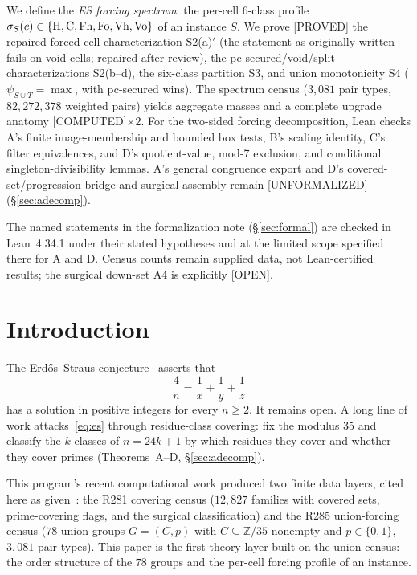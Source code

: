 \documentclass[11pt,a4paper]{article}
\theoremstyle{definition}
\newcommand{\cH}{\textnormal{H}}
\newcommand{\cC}{\textnormal{C}}
\newcommand{\cFh}{\textnormal{Fh}}
\newcommand{\cFo}{\textnormal{Fo}}
\newcommand{\cVh}{\textnormal{Vh}}
\newcommand{\cVo}{\textnormal{Vo}}
\begin{document}
We define the \emph{ES forcing spectrum}: the per-cell $6$-class profile
$\sigma_S(c)\in\{\cH,\cC,\cFh,\cFo,\cVh,\cVo\}$ of an instance $S$.  We prove
[PROVED] the repaired forced-cell characterization S2(a)$'$ (the statement as
originally written fails on void cells; repaired after review), the
pc-secured/void/split characterizations S2(b--d), the six-class partition S3,
and union monotonicity S4 ($\psi_{S\cup T}=\max$, with pc-secured wins).  The
spectrum census ($3{,}081$ pair types, $82{,}272{,}378$ weighted pairs) yields
aggregate masses and a complete upgrade anatomy [COMPUTED]$\times2$.  For
the two-sided forcing decomposition, Lean checks A's finite image-membership
and bounded box tests, B's scaling identity, C's filter equivalences, and
D's quotient-value, mod-7 exclusion, and conditional singleton-divisibility
lemmas. A's general congruence export and D's covered-set/progression bridge
and surgical assembly remain [UNFORMALIZED] (\S\ref{sec:adecomp}).

The named statements in the formalization note (\S\ref{sec:formal}) are
checked in Lean~4.34.1 under their stated hypotheses and at the limited
scope specified there for A and D. Census counts remain supplied data,
not Lean-certified results; the surgical down-set A4 is explicitly [OPEN].

\section{Introduction}

The Erd\H{o}s--Straus conjecture~\cite{Erd50} asserts that
\begin{equation}
  \label{eq:es}
  \frac{4}{n}=\frac{1}{x}+\frac{1}{y}+\frac{1}{z}
\end{equation}
has a solution in positive integers for every $n\ge2$.  It remains open.
A long line of work attacks~\eqref{eq:es} through residue-class covering:
fix the modulus $35$ and classify the $k$-classes of $n=24k+1$ by which
residues they cover and whether they cover primes
(Theorems~A--D, \S\ref{sec:adecomp}).

This program's recent computational work produced two finite data layers,
cited here as given~\cite{D322}: the R281 covering census ($12{,}827$
families with covered sets, prime-covering flags, and the surgical
classification) and the R285 union-forcing census ($78$ union groups
$G=(C,p)$ with $C\subseteq\mathbb{Z}/35$ nonempty and $p\in\{0,1\}$, $3{,}081$
pair types).  This paper is the first theory layer built on the union
census: the order structure of the $78$ groups and the per-cell forcing
profile of an instance.
\end{document}
